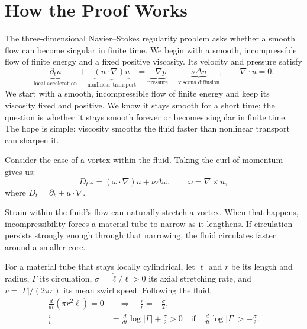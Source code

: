 \begingroup
\setlength{\parindent}{0pt}
\setlength{\parskip}{0.40\baselineskip}
\setlength{\abovedisplayskip}{6.5pt plus 1.5pt minus 1.5pt}
\setlength{\belowdisplayskip}{6.5pt plus 1.5pt minus 1.5pt}
\setlength{\jot}{5pt}

\section*{How the Proof Works}

The three-dimensional Navier--Stokes regularity problem asks whether a smooth
flow can become singular in finite time. We begin with a smooth,
incompressible flow of finite energy and a fixed positive viscosity. Its
velocity and pressure satisfy
\[
 \underbrace{\partial_tu}_{\text{local acceleration}}
 +\underbrace{(u\!\cdot\nabla)u}_{\text{nonlinear transport}}
 =\underbrace{-\nabla p}_{\text{pressure}}
 +\underbrace{\nu\Delta u}_{\text{viscous diffusion}},
 \qquad \nabla\!\cdot u=0.
\]
We start with a smooth, incompressible flow of finite energy and keep its
viscosity fixed and positive. We know it stays smooth for a short time; the
question is whether it stays smooth forever or becomes singular in finite
time. The hope is simple: viscosity smooths the fluid faster than nonlinear
transport can sharpen it.

Consider the case of a vortex within the fluid. Taking the curl of momentum
gives us:
\[
 D_t\omega=(\omega\cdot\nabla)u+\nu\Delta\omega,
 \qquad \omega=\nabla\times u,
\]
where \(D_t=\partial_t+u\cdot\nabla\).

Strain within the fluid's flow can naturally stretch a vortex. When that
happens, incompressibility forces a material tube to narrow as it lengthens.
If circulation persists strongly enough through that narrowing, the fluid
circulates faster around a smaller core.

For a material tube that stays locally cylindrical, let \(\ell\) and \(r\)
be its length and radius, \(\Gamma\) its circulation,
\(\sigma=\dot\ell/\ell>0\) its axial stretching rate, and
\(v=|\Gamma|/(2\pi r)\) its mean swirl speed. Following the fluid,
\[
 \begin{aligned}
 \frac{d}{dt}(\pi r^2\ell)=0
 &\quad\Longrightarrow\quad \frac{\dot r}{r}=-\frac{\sigma}{2},\\
 \frac{\dot v}{v}
 &=\frac{d}{dt}\log|\Gamma|+\frac{\sigma}{2}>0
 \quad\text{if}\quad \frac{d}{dt}\log|\Gamma|>-\frac{\sigma}{2}.
 \end{aligned}
\]

